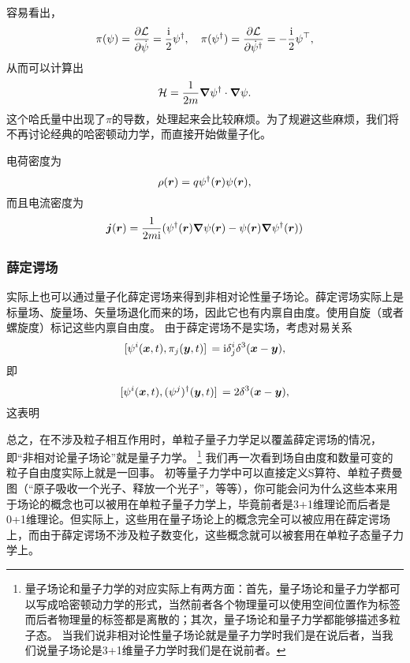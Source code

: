 容易看出，
\[
    \pi(\psi) = \pdv{\mathcal{L}}{\dot{\psi}} = \frac{\mathrm{i}}{2} \psi^\dagger, \quad \pi(\psi^\dagger) = \pdv{\mathcal{L}}{\dot{\psi}^\dagger} = - \frac{\mathrm{i}}{2} \psi^\top,
\]
从而可以计算出
\begin{equation}
    \mathcal{H} = \frac{1}{2m} \grad{\psi^\dagger} \cdot \grad{\psi}.
\end{equation}
这个哈氏量中出现了$\pi$的导数，处理起来会比较麻烦。为了规避这些麻烦，我们将不再讨论经典的哈密顿动力学，而直接开始做量子化。

电荷密度为
\begin{equation}
    \rho(\vb*{r}) = q \psi^\dagger(\vb*{r}) \psi(\vb*{r}),
\end{equation}
而且电流密度为
\begin{equation}
    \vb*{j}(\vb*{r}) = \frac{1}{2m\mathrm{i}} (\psi^\dagger(\vb*{r}) \grad{\psi}(\vb*{r}) - \psi(\vb*{r}) \grad{\psi}^\dagger(\vb*{r}))
\end{equation}

\subsubsection{薛定谔场}

实际上也可以通过量子化薛定谔场来得到非相对论性量子场论。薛定谔场实际上是标量场、旋量场、矢量场退化而来的场，因此它也有内禀自由度。使用自旋（或者螺旋度）标记这些内禀自由度。
由于薛定谔场不是实场，考虑对易关系
\[
    \comm*{{\psi}^i(\vb*{x}, t)}{{\pi}_j(\vb*{y}, t)} = \ii \delta^i_j \delta^3 (\vb*{x} - \vb*{y}),
\]
即
\[
    \comm*{{\psi}^i(\vb*{x}, t)}{({\psi}^j)^\dagger (\vb*{y}, t)} = 2 \delta^3 (\vb*{x} - \vb*{y}),
\]
这表明

总之，在不涉及粒子相互作用时，单粒子量子力学足以覆盖薛定谔场的情况，即“非相对论量子场论”就是量子力学。%
\footnote{
    量子场论和量子力学的对应实际上有两方面：首先，量子场论和量子力学都可以写成哈密顿动力学的形式，当然前者各个物理量可以使用空间位置作为标签而后者物理量的标签都是离散的；其次，量子场论和量子力学都能够描述多粒子态。
    当我们说非相对论性量子场论就是量子力学时我们是在说后者，当我们说量子场论是3+1维量子力学时我们是在说前者。
}%
我们再一次看到场自由度和数量可变的粒子自由度实际上就是一回事。
初等量子力学中可以直接定义S算符、单粒子费曼图（“原子吸收一个光子、释放一个光子”，等等），你可能会问为什么这些本来用于场论的概念也可以被用在单粒子量子力学上，毕竟前者是3+1维理论而后者是0+1维理论。但实际上，这些用在量子场论上的概念完全可以被应用在薛定谔场上，而由于薛定谔场不涉及粒子数变化，这些概念就可以被套用在单粒子态量子力学上。

